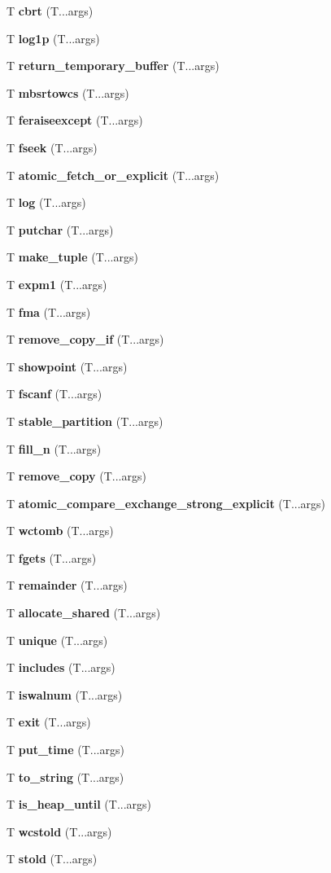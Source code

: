 \begin{DoxyCompactItemize}
T {\bf cbrt} (T...\+args)
\item 
T {\bf log1p} (T...\+args)
\item 
T {\bf return\+\_\+temporary\+\_\+buffer} (T...\+args)
\item 
T {\bf mbsrtowcs} (T...\+args)
\item 
T {\bf feraiseexcept} (T...\+args)
\item 
T {\bf fseek} (T...\+args)
\item 
T {\bf atomic\+\_\+fetch\+\_\+or\+\_\+explicit} (T...\+args)
\item 
T {\bf log} (T...\+args)
\item 
T {\bf putchar} (T...\+args)
\item 
T {\bf make\+\_\+tuple} (T...\+args)
\item 
T {\bf expm1} (T...\+args)
\item 
T {\bf fma} (T...\+args)
\item 
T {\bf remove\+\_\+copy\+\_\+if} (T...\+args)
\item 
T {\bf showpoint} (T...\+args)
\item 
T {\bf fscanf} (T...\+args)
\item 
T {\bf stable\+\_\+partition} (T...\+args)
\item 
T {\bf fill\+\_\+n} (T...\+args)
\item 
T {\bf remove\+\_\+copy} (T...\+args)
\item 
T {\bf atomic\+\_\+compare\+\_\+exchange\+\_\+strong\+\_\+explicit} (T...\+args)
\item 
T {\bf wctomb} (T...\+args)
\item 
T {\bf fgets} (T...\+args)
\item 
T {\bf remainder} (T...\+args)
\item 
T {\bf allocate\+\_\+shared} (T...\+args)
\item 
T {\bf unique} (T...\+args)
\item 
T {\bf includes} (T...\+args)
\item 
T {\bf iswalnum} (T...\+args)
\item 
T {\bf exit} (T...\+args)
\item 
T {\bf put\+\_\+time} (T...\+args)
\item 
T {\bf to\+\_\+string} (T...\+args)
\item 
T {\bf is\+\_\+heap\+\_\+until} (T...\+args)
\item 
T {\bf wcstold} (T...\+args)
\item 
T {\bf stold} (T...\+args)
\item 

\end{DoxyCompactItemize}
